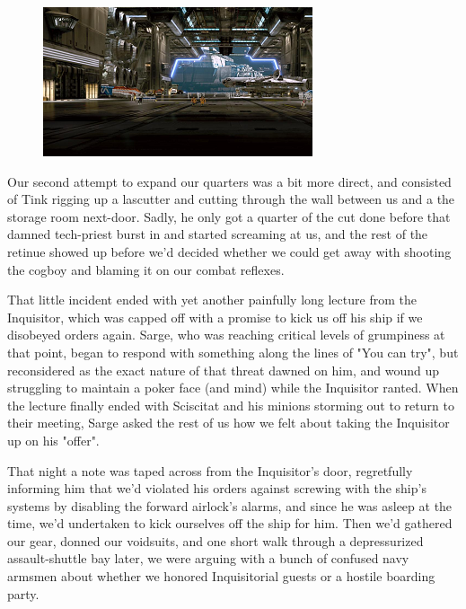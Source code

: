 \begin{figure}
	\begin{center}
		\includegraphics[width=\figwidth]{pics/17/23.png}
	\end{center}
\end{figure}
Our second attempt to expand our quarters was a bit more direct, and consisted of Tink rigging up a lascutter and cutting through the wall between us and a the storage room next-door. 
Sadly, he only got a quarter of the cut done before that damned tech-priest burst in and started screaming at us, and the rest of the retinue showed up before we'd decided whether we could get away with shooting the cogboy and blaming it on our combat reflexes. 


That little incident ended with yet another painfully long lecture from the Inquisitor, which was capped off with a promise to kick us off his ship if we disobeyed orders again. 
Sarge, who was reaching critical levels of grumpiness at that point, began to respond with something along the lines of "You can try", but reconsidered as the exact nature of that threat dawned on him, and wound up struggling to maintain a poker face (and mind) while the Inquisitor ranted. 
When the lecture finally ended with Sciscitat and his minions storming out to return to their meeting, Sarge asked the rest of us how we felt about taking the Inquisitor up on his "offer".

That night a note was taped across from the Inquisitor's door, regretfully informing him that we'd violated his orders against screwing with the ship's systems by disabling the forward airlock's alarms, and since he was asleep at the time, we'd undertaken to kick ourselves off the ship for him. 
Then we'd gathered our gear, donned our voidsuits, and one short walk through a depressurized assault-shuttle bay later, we were arguing with a bunch of confused navy armsmen about whether we honored Inquisitorial guests or a hostile boarding party.

